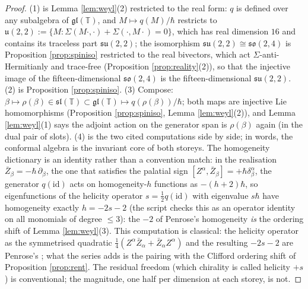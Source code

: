 \documentclass[11pt]{article}
\theoremstyle{definition}
\newcommand{\T}{\mathbb{T}}
\begin{document}
\begin{proof}
(1) is Lemma \ref{lem:weyl}(2) restricted to the real form: $q$ is defined over any subalgebra of $\mathfrak{gl}(\T)$, and $M \mapsto q(M)/\hbar$ restricts to $\mathfrak{u}(2,2) := \{M : \Sigma(M\cdot,\cdot) + \Sigma(\cdot,M\cdot) = 0\}$, which has real dimension $16$ and contains its traceless part $\mathfrak{su}(2,2)$; the isomorphism $\mathfrak{su}(2,2)\cong\mathfrak{so}(2,4)$ is Proposition \ref{prop:spiniso} restricted to the real bivectors, which act $\Sigma$-anti-Hermitianly and trace-free (Proposition \ref{prop:reality}(2)), so that the injective image of the fifteen-dimensional $\mathfrak{so}(2,4)$ is the fifteen-dimensional $\mathfrak{su}(2,2)$. (2) is Proposition \ref{prop:spiniso}. (3) Compose: $\beta \mapsto \rho(\beta) \in \mathfrak{sl}(\T) \subset \mathfrak{gl}(\T) \mapsto q(\rho(\beta))/\hbar$; both maps are injective Lie homomorphisms (Proposition \ref{prop:spiniso}, Lemma \ref{lem:weyl}(2)), and Lemma \ref{lem:weyl}(1) says the adjoint action on the generator span is $\rho(\beta)$ again (in the dual pair of slots). (4) is the two cited computations side by side; in words, the conformal algebra is the invariant core of both storeys. The homogeneity dictionary is an identity rather than a convention match: in the realisation $\bar Z_\beta = -\hbar\,\partial_\beta$, the one that satisfies the palatial sign $[Z^\alpha, \bar Z_\beta] = +\hbar\delta^\alpha_\beta$, the generator $q(\mathrm{id})$ acts on homogeneity-$h$ functions as $-(h+2)\hbar$, so eigenfunctions of the helicity operator $s = \tfrac12 q(\mathrm{id})$ with eigenvalue $s\hbar$ have homogeneity exactly $h = -2s - 2$ (the script checks this as an operator identity on all monomials of degree $\le 3$): the $-2$ of Penrose's homogeneity \cite{Penrose1967, PenroseRindler86} \emph{is} the ordering shift of Lemma \ref{lem:weyl}(3). This computation is classical: the helicity operator as the symmetrised quadratic $\tfrac14(Z^\alpha\bar Z_\alpha + \bar Z_\alpha Z^\alpha)$ and the resulting $-2s-2$ are Penrose's \cite[Vol.~2, Ch.~6]{PenroseRindler86}; what the series adds is the pairing with the Clifford ordering shift of Proposition \ref{prop:rent}. The residual freedom (which chirality is called helicity $+s$) is conventional; the magnitude, one half per dimension at each storey, is not.
\end{proof}
\end{document}
